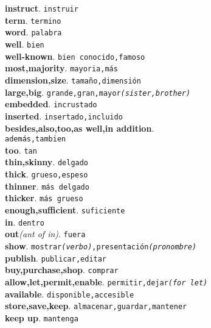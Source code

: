 \documentclass[twocolumn]{article}
\begin{document}
	\textsf{\textbf{instruct}}. \texttt{instruir}\\
	\textsf{\textbf{term}}. \texttt{termino}\\
	\textsf{\textbf{word}}. \texttt{palabra}\\
	\textsf{\textbf{well}}. \texttt{bien}\\
	\textsf{\textbf{well-known}}. \texttt{bien conocido,famoso}\\
	\textsf{\textbf{most,majority}}. \texttt{mayoria,m\'as}\\
	\textsf{\textbf{dimension,size}}. \texttt{tama\~no,dimensi\'on}\\
	\textsf{\textbf{large,big}}. \texttt{grande,gran,mayor{\scriptsize \textsl{(sister,brother)}}}\\
	\textsf{\textbf{embedded}}. \texttt{incrustado}\\
	\textsf{\textbf{inserted}}. \texttt{insertado,incluido}\\
	\textsf{\textbf{besides,also,too,as well,in addition}}.\\\texttt{adem\'as,tambien}\\
	\textsf{\textbf{too}}. \texttt{tan}\\
	\textsf{\textbf{thin,skinny}}. \texttt{delgado}\\
	\textsf{\textbf{thick}}. \texttt{grueso,espeso}\\
	\textsf{\textbf{thinner}}. \texttt{m\'as delgado}\\
	\textsf{\textbf{thicker}}. \texttt{m\'as grueso}\\
	\textsf{\textbf{enough,sufficient}}. \texttt{suficiente}\\
	\textsf{\textbf{in}}. \texttt{dentro}\\
	\textsf{\textbf{out}}{\scriptsize \textsl{(ant of in)}}. \texttt{fuera}\\
	\textsf{\textbf{show}}. \texttt{mostrar{\scriptsize \textsl{(verbo)}},presentaci\'on{\scriptsize \textsl{(pronombre)}}}\\
	\textsf{\textbf{publish}}. \texttt{publicar,editar}\\
	\textsf{\textbf{buy,purchase,shop}}. \texttt{comprar}\\
	\textsf{\textbf{allow,let,permit,enable}}. \texttt{permitir,dejar{\scriptsize \textsl{(for let)}}}\\
	\textsf{\textbf{available}}. \texttt{disponible,accesible}\\
	\textsf{\textbf{store,save,keep}}. \texttt{almacenar,guardar,mantener}\\
	\textsf{\textbf{keep up}}. \texttt{mantenga}\\
\end{document}
